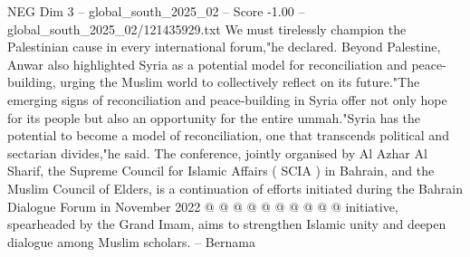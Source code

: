 \begin{textsample}{NEG Dim 3 – global\_south\_2025\_02 – Score -1.00 – global\_south\_2025\_02/121435929.txt}
We must tirelessly champion the Palestinian cause in every international forum,"he declared.
Beyond Palestine, Anwar also highlighted Syria as a potential model for reconciliation and peace-building, urging the Muslim world to collectively reflect on its future."The emerging signs of reconciliation and peace-building in Syria offer not only hope for its people but also an opportunity for the entire ummah."Syria has the potential to become a model of reconciliation, one that transcends political and sectarian divides,"he said.
The conference, jointly organised by Al Azhar Al Sharif, the Supreme Council for Islamic Affairs ( SCIA ) in Bahrain, and the Muslim Council of Elders, is a continuation of efforts initiated during the Bahrain Dialogue Forum in November 2022 @ @ @ @ @ @ @ @ @ @ initiative, spearheaded by the Grand Imam, aims to strengthen Islamic unity and deepen dialogue among Muslim scholars. -- Bernama

\end{textsample}
